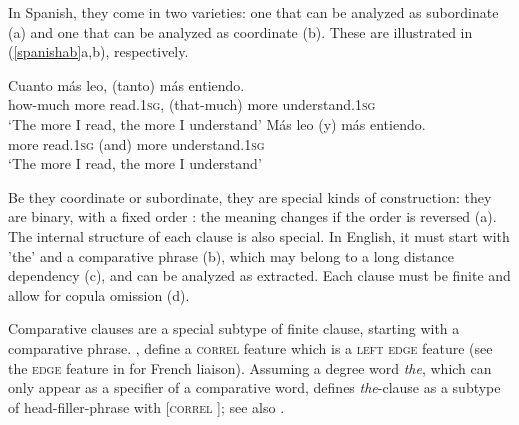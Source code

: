 \documentclass[output=paper
                ,modfonts
                ,nonflat
	        ,collection
	        ,collectionchapter
	        ,collectiontoclongg
 	        ,biblatex
                ,babelshorthands
                ,newtxmath
                ,draftmode
                ,colorlinks, citecolor=brown
]{./langsci/langscibook}
\begin{document}
In Spanish, they come in two varieties: one that can be analyzed as subordinate (a) and one that can be analyzed as coordinate (b).
These are illustrated in (\ref{spanishab}a,b), respectively.


\begin{exe}
 \ex
\begin{xlista}
\ex \gll	Cuanto       m\'{a}s   leo,     (tanto)        m\'{a}s entiendo. \\
how-much more read.1\textsc{sg}, (that-much) more understand.1\textsc{sg} \\
\glt `The more I read, the more I understand'
\ex \gll	M\'{a}s leo        (y) m\'{a}s entiendo. \\
	more read.1\textsc{sg} (and) more understand.1\textsc{sg} \\
\glt `The more I read, the more I understand'\\
\citep{Abeille:Borsley:Espinal:06}
\end{xlista}\label{spanishab}
\end{exe}

Be they coordinate or subordinate, they are special kinds of construction: they are binary, with a fixed order : the meaning changes if the order is reversed (a).
The internal structure of each clause is also special. In English, it must start with 'the' and a comparative phrase (b), which may belong to a long distance dependency (c), and can be analyzed as extracted. Each clause must be finite and allow for copula omission (d).

\begin{exe}
 \ex
\begin{xlista}
\end{xlista}
\end{exe}

Comparative clauses are a special subtype of finite clause, starting with a comparative phrase. \citet{Abeille:Borsley:Espinal:06}, 
\citet{Borsley:11} 
define a \textsc{correl} feature which is a \textsc{left edge} feature (see the \textsc{edge} feature in \citet{Bonami:2004} for French liaison). Assuming a degree word \textit{the}, which can only appear as a specifier of a comparative word, \citet{Borsley:11}  defines \textit{the}-clause as a subtype of head-filler-phrase with [\textsc{correl} ]; see also \citet{fgsag08}.
\end{document}

